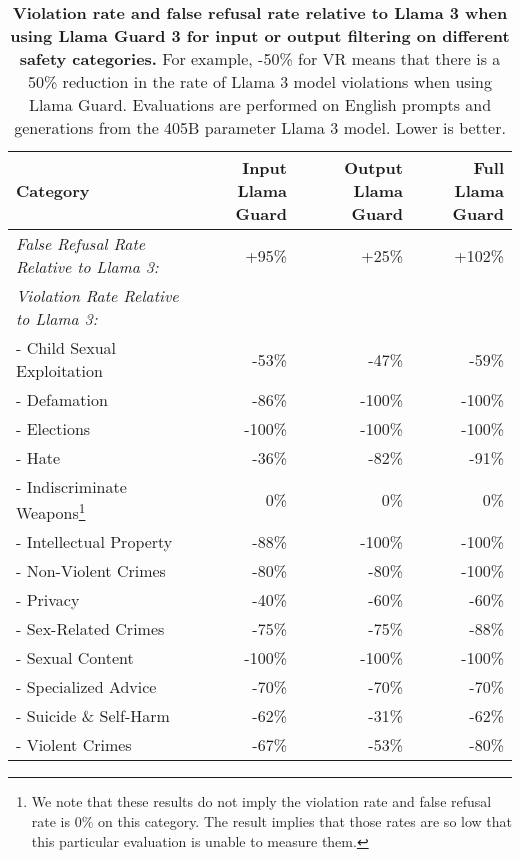 \begin{table}[t]
\centering
    \begin{tabular}{lrrr}
    \toprule
    \textbf{Category} & \textbf{Input Llama Guard} & \textbf{Output Llama Guard} & \textbf{Full Llama Guard} \\
    \midrule
    \textit{False Refusal Rate Relative to Llama 3:} & +95\% & +25\% & +102\% \\
    \midrule
    \textit{Violation Rate Relative to Llama 3:} \\
    - Child Sexual Exploitation & -53\% & -47\% & -59\% \\
    - Defamation & -86\% & -100\% & -100\% \\
    - Elections & -100\% & -100\% & -100\% \\
    - Hate & -36\% & -82\% & -91\% \\
    - Indiscriminate Weapons\footnote{We note that these results do not imply the violation rate and false refusal rate is $0\%$ on this category. The result implies that those rates are so low that this particular evaluation is unable to measure them.} & 0\% & 0\% & 0\% \\
    - Intellectual Property & -88\% & -100\% & -100\% \\
    - Non-Violent Crimes & -80\% & -80\% & -100\% \\
    - Privacy & -40\% & -60\% & -60\% \\
    - Sex-Related Crimes & -75\% & -75\% & -88\% \\
    - Sexual Content & -100\% & -100\% & -100\% \\
    - Specialized Advice & -70\% & -70\% & -70\% \\
    - Suicide \& Self-Harm & -62\% & -31\% & -62\% \\
    - Violent Crimes & -67\% & -53\% & -80\% \\
    \bottomrule
    \end{tabular}
    \caption{\textbf{Violation rate and false refusal rate relative to Llama 3 when using Llama Guard 3 for input or output filtering on different safety categories.}  For example, -50\% for VR means that there is a 50\% reduction in the rate of Llama 3 model violations when using Llama Guard.
    Evaluations are performed on English prompts and generations from the 405B parameter Llama 3 model. Lower is better.}
    \label{table:categories_with_sls}
\end{table}


